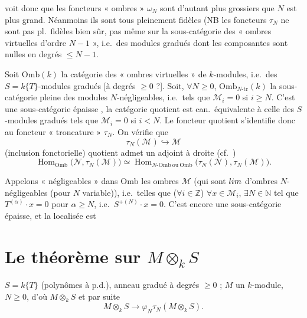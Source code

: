 \documentclass[11pt,a4paper]{article}
\begin{document}
voit donc que les foncteurs « ombres » $\omega_N$ sont d'autant plus grossiers que $N$ est
plus grand. Néanmoins ils sont tous pleinement fidèles (NB les foncteurs $\tau_N$ ne sont pas
pl.\ fidèles bien sûr, pas même sur la sous-catégorie des « ombres virtuelles
d'ordre $N-1$ », i.e.\ des modules gradués dont les composantes sont nulles en degrés
$\leq N-1$.

Soit $\mathrm{Omb}(k)$ la catégorie des « ombres virtuelles » de $k$-modules, i.e.\ des
$S = k\{T\}$-modules gradués [à degrés $\geq 0$ ?]. Soit, $\forall N \geq 0$,
$\mathrm{Omb}_{N\text{-tr}}(k)$ la sous-catégorie pleine des modules $N$-négligeables,
i.e.\ tels que $\mathcal{M}_i = 0$ si $i \geq N$.
C'est une sous-catégorie épaisse , la
catégorie quotient   est can.\ équivalente à
celle des $S$-modules gradués tels que $\mathcal{M}_i = 0$ si $i < N$. Le foncteur quotient
s'identifie donc au foncteur « troncature » $\tau_N$. On vérifie que
\[
  \tau_N(\mathcal{M}) \hookrightarrow \mathcal{M}
\]
(inclusion fonctorielle)   
quotient admet un adjoint à droite (cf.\ )
\[
  \operatorname{Hom}_{\mathrm{Omb}}\bigl(\mathcal{N}, \tau_N(\mathcal{M})\bigr) \simeq
  \operatorname{Hom}_{N\text{-}\mathrm{Omb}\ \text{ou}\ \mathrm{Omb}}\bigl(\tau_N(\mathcal{N}), \tau_N(\mathcal{M})\bigr) .
\]

Appelons « négligeables » dans $\mathrm{Omb}$ les ombres $\mathcal{M}$ (qui sont
$\varinjlim$  d'ombres $N$-négligeables (pour $N$ variable)), i.e.\ telles que
($\forall i \in \mathbb{Z}$) $\forall x \in \mathcal{M}_i$, $\exists N \in \mathbb{N}$ tel que
$T^{(\alpha)} \cdot x = 0$ pour $\alpha \geq N$, i.e.\ $S^{+(N)} \cdot x = 0$. C'est encore une
sous-catégorie épaisse, et la localisée est

\section{Le théorème sur $M \otimes_k S$}

$S = k\{T\}$ (polynômes à p.d.), anneau gradué à degrés $\geq 0$ ; $M$ un $k$-module,
$N \geq 0$, d'où $M \otimes_k S$ et par suite
\[
  M \otimes_k S \to \varphi_N \tau_N (M \otimes_k S) .
\]
\end{document}
